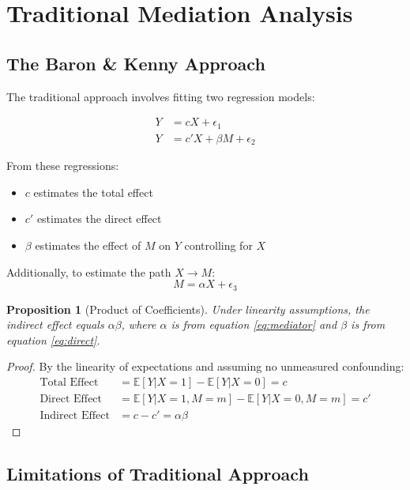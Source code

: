 \documentclass[11pt,a4paper]{article}
\newtheorem{proposition}[theorem]{Proposition}
\newcommand{\E}{\mathbb{E}}
\begin{document}
\section{Traditional Mediation Analysis}

\subsection{The Baron \& Kenny Approach}

The traditional approach \citep{baron1986moderator} involves fitting two regression models:

\begin{align}
Y &= c X + \epsilon_1 \label{eq:total}\\
Y &= c' X + \beta M + \epsilon_2 \label{eq:direct}
\end{align}

From these regressions:
\begin{itemize}
    \item $c$ estimates the total effect
    \item $c'$ estimates the direct effect
    \item $\beta$ estimates the effect of $M$ on $Y$ controlling for $X$
\end{itemize}

Additionally, to estimate the path $X \to M$:
\begin{equation}
M = \alpha X + \epsilon_3 \label{eq:mediator}
\end{equation}

\begin{proposition}[Product of Coefficients]
Under linearity assumptions, the indirect effect equals $\alpha \beta$, where $\alpha$ is from equation \eqref{eq:mediator} and $\beta$ is from equation \eqref{eq:direct}.
\end{proposition}

\begin{proof}
By the linearity of expectations and assuming no unmeasured confounding:
\begin{align}
\text{Total Effect} &= \E[Y|X=1] - \E[Y|X=0] = c \\
\text{Direct Effect} &= \E[Y|X=1,M=m] - \E[Y|X=0,M=m] = c' \\
\text{Indirect Effect} &= c - c' = \alpha \beta
\end{align}
\end{proof}

\subsection{Limitations of Traditional Approach}
\end{document}
